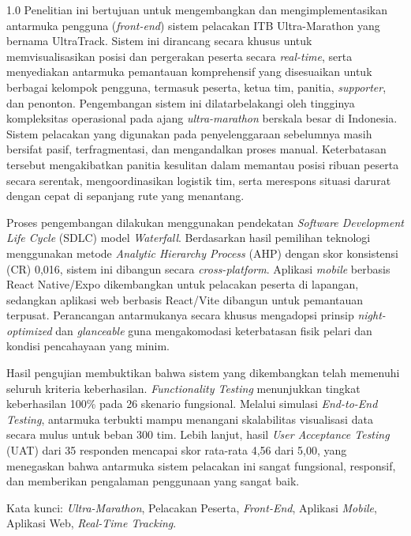 \begin{spacing}{1.0}
Penelitian ini bertujuan untuk mengembangkan dan mengimplementasikan antarmuka pengguna (\textit{front-end}) sistem pelacakan ITB Ultra-Marathon yang bernama UltraTrack. Sistem ini dirancang secara khusus untuk memvisualisasikan posisi dan pergerakan peserta secara \textit{real-time}, serta menyediakan antarmuka pemantauan komprehensif yang disesuaikan untuk berbagai kelompok pengguna, termasuk peserta, ketua tim, panitia, \textit{supporter}, dan penonton. Pengembangan sistem ini dilatarbelakangi oleh tingginya kompleksitas operasional pada ajang \textit{ultra-marathon} berskala besar di Indonesia. Sistem pelacakan yang digunakan pada penyelenggaraan sebelumnya masih bersifat pasif, terfragmentasi, dan mengandalkan proses manual. Keterbatasan tersebut mengakibatkan panitia kesulitan dalam memantau posisi ribuan peserta secara serentak, mengoordinasikan logistik tim, serta merespons situasi darurat dengan cepat di sepanjang rute yang menantang.

Proses pengembangan dilakukan menggunakan pendekatan \textit{Software Development Life Cycle} (SDLC) model \textit{Waterfall}. Berdasarkan hasil pemilihan teknologi menggunakan metode \textit{Analytic Hierarchy Process} (AHP) dengan skor konsistensi (CR) 0,016, sistem ini dibangun secara \textit{cross-platform}. Aplikasi \textit{mobile} berbasis React Native/Expo dikembangkan untuk pelacakan peserta di lapangan, sedangkan aplikasi web berbasis React/Vite dibangun untuk pemantauan terpusat. Perancangan antarmukanya secara khusus mengadopsi prinsip \textit{night-optimized} dan \textit{glanceable} guna mengakomodasi keterbatasan fisik pelari dan kondisi pencahayaan yang minim.

Hasil pengujian membuktikan bahwa sistem yang dikembangkan telah memenuhi seluruh kriteria keberhasilan. \textit{Functionality Testing} menunjukkan tingkat keberhasilan 100\% pada 26 skenario fungsional. Melalui simulasi \textit{End-to-End Testing}, antarmuka terbukti mampu menangani skalabilitas visualisasi data secara mulus untuk beban 300 tim. Lebih lanjut, hasil \textit{User Acceptance Testing} (UAT) dari 35 responden mencapai skor rata-rata 4,56 dari 5,00, yang menegaskan bahwa antarmuka sistem pelacakan ini sangat fungsional, responsif, dan memberikan pengalaman penggunaan yang sangat baik.
\vspace{0.5cm}

Kata kunci: \textit{Ultra-Marathon}, Pelacakan Peserta, \textit{Front-End}, Aplikasi \textit{Mobile}, Aplikasi Web, \textit{Real-Time Tracking}.
\end{spacing}
